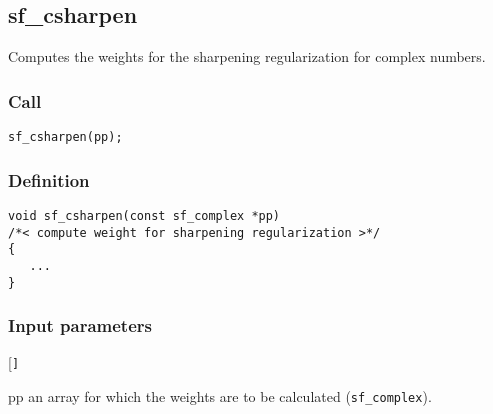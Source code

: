 \subsection{{sf\_csharpen}}
Computes the weights for the sharpening regularization for complex numbers.

\subsubsection*{Call}
\begin{verbatim}sf_csharpen(pp);\end{verbatim}

\subsubsection*{Definition}
\begin{verbatim}
void sf_csharpen(const sf_complex *pp) 
/*< compute weight for sharpening regularization >*/
{
   ...
}
\end{verbatim}

\subsubsection*{Input parameters}
\begin{desclist}{\tt }{\quad}[\tt ]
   \setlength\itemsep{0pt}
   \item[pp] an array for which the weights are to be calculated (\texttt{sf\_complex}).  
\end{desclist}





